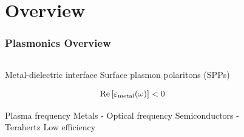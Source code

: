 \documentclass[mathserif,16pt,xcolor=table]{beamer}
\begin{document}
\section{Overview}
\begin{frame}
  \frametitle{Plasmonics Overview}
  \begin{columns} %
    \begin{column}{.4\textwidth}
      \begin{outline}[itemize]
        \1 Metal-dielectric interface
        \1 Surface plasmon polaritons (SPPs)
        \end{outline}
        \begin{equation} \nonumber
          \Re \left[ \varepsilon_{\text{metal}}(\omega)\right] < 0
        \end{equation}
        \begin{outline}[itemize]
        \1 Plasma frequency
          \2 Metals - Optical frequency
          \2 Semiconductors - Terahertz
        \1 Low efficiency
      \end{outline}
    \end{column}
    \begin{column}{.6\textwidth}
      \begin{figure}[b!]
        \hspace*{-1cm} \vspace*{0.5cm}
        \def\svgwidth{1.15\linewidth}
        
        \label{fig:spp}
      \end{figure}
      \end{column}%
    \end{columns}
  \end{frame}
\end{document}
